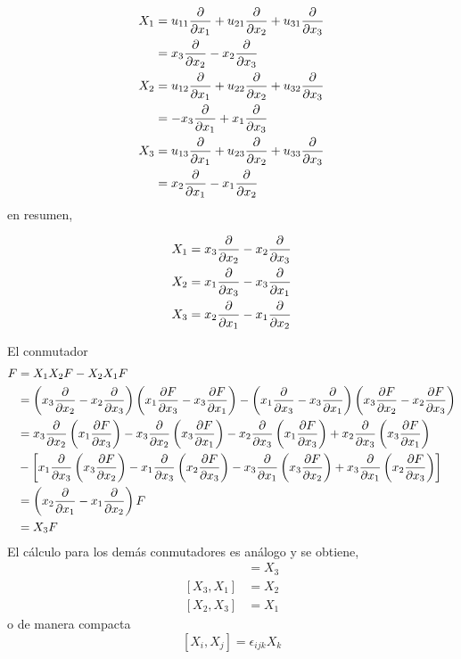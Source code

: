 \begin{sol}
\begin{align}
  X_1&=u_{11}\pdv{x_1}+u_{21}\pdv{x_2}+u_{31}\pdv{x_3}\\
  &=x_3\pdv{x_2}-x_2\pdv{x_3}\\
  X_2&=u_{12}\pdv{x_1}+u_{22}\pdv{x_2}+u_{32}\pdv{x_3}\\
  &=-x_3\pdv{x_1}+x_1\pdv{x_3}\\
  X_3&=u_{13}\pdv{x_1}+u_{23}\pdv{x_2}+u_{33}\pdv{x_3}\\
  &=x_2\pdv{x_1}-x_1\pdv{x_2}\\
\end{align}
en resumen,
\begin{tcolorbox}
\begin{align}
  X_1
  &=x_3\pdv{x_2}-x_2\pdv{x_3}\\
  X_2
  &=x_1\pdv{x_3}-x_3\pdv{x_1}\\
  X_3  &=x_2\pdv{x_1}-x_1\pdv{x_2}\\
\end{align}
\end{tcolorbox}

El conmutador
\begin{align*}
  [X_1,X_2]F&=X_1X_2F-X_2X_1F\\
  &=\left(x_3\pdv{x_2}-x_2\pdv{x_3}\right)\left(x_1\pdv{F}{x_3}-x_3\pdv{F}{x_1}\right)-\left(x_1\pdv{x_3}-x_3\pdv{x_1}\right)\left(x_3\pdv{F}{x_2}-x_2\pdv{F}{x_3}\right)\\
  &=x_3\pdv{x_2}\left(x_1\pdv{F}{x_3}\right)-x_3\pdv{x_2}\left(x_3\pdv{F}{x_1}\right)-
  x_2\pdv{x_3}\left(x_1\pdv{F}{x_3}\right)+x_2\pdv{x_3}\left(x_3\pdv{F}{x_1}\right)\\
  &-\left[x_1\pdv{x_3}\left(x_3\pdv{F}{x_2}\right)-x_1\pdv{x_3}\left(x_2\pdv{F}{x_3}\right)-x_3\pdv{x_1}\left(x_3\pdv{F}{x_2}\right)+x_3\pdv{x_1}\left(x_2\pdv{F}{x_3}\right)\right]\\
  &=\left(x_2\pdv{x_1}-x_1\pdv{x_2}\right)F\\
  &=X_3 F
\end{align*}
El cálculo para los demás conmutadores es análogo y se obtiene,
\begin{align}
  [X_1,X_2]&=X_3\\
  [X_3,X_1]&=X_2\\
  [X_2,X_3]&=X_1
\end{align}
o de manera compacta
\begin{equation}
  \boxed{[X_i,X_j]=\epsilon_{ijk}X_k}
\end{equation}
\end{sol}



























